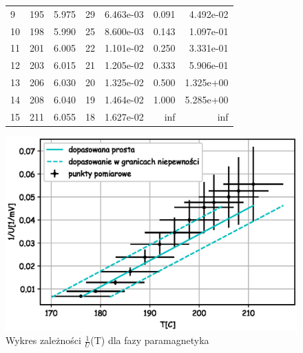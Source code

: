 \documentclass[a4paper,10pt]{article}
\begin{document}
\begin{figure}
\begin{tabular}{lrrrrrr}
9 &            195 &                  5.975 &                           29 &                           6.463e-03 &                                0.091 &                                   4.492e-02 \\
10 &            198 &                  5.990 &                           25 &                           8.600e-03 &                                0.143 &                                   1.097e-01 \\
11 &            201 &                  6.005 &                           22 &                           1.101e-02 &                                0.250 &                                   3.331e-01 \\
12 &            203 &                  6.015 &                           21 &                           1.205e-02 &                                0.333 &                                   5.906e-01 \\
13 &            206 &                  6.030 &                           20 &                           1.325e-02 &                                0.500 &                                   1.325e+00 \\
14 &            208 &                  6.040 &                           19 &                           1.464e-02 &                                1.000 &                                   5.285e+00 \\
15 &            211 &                  6.055 &                           18 &                           1.627e-02 &                                  inf &                                         inf \\
\bottomrule
\end{tabular}
\end{figure}
\begin{figure}[H]
  \includegraphics{./Curie_odwrotnosc.eps}
  \caption{Wykres zależności $\frac{1}{U}$(T) dla fazy paramagnetyka}
\end{figure}
\end{document}
